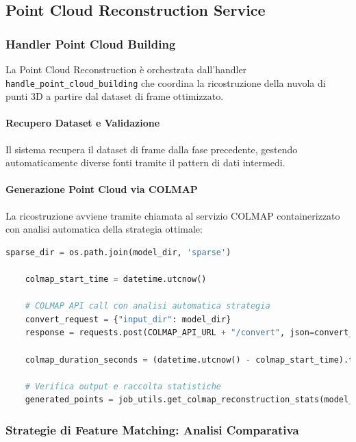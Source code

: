 \subsection{Point Cloud Reconstruction Service}

\subsubsection{Handler Point Cloud Building}
La Point Cloud Reconstruction è orchestrata dall'handler \texttt{handle\_point\_cloud\_building} che coordina la ricostruzione della nuvola di punti 3D a partire dal dataset di frame ottimizzato.

\paragraph{Recupero Dataset e Validazione}
Il sistema recupera il dataset di frame dalla fase precedente, gestendo automaticamente diverse fonti tramite il pattern di dati intermedi.

\paragraph{Generazione Point Cloud via COLMAP}
La ricostruzione avviene tramite chiamata al servizio COLMAP containerizzato con analisi automatica della strategia ottimale:

\begin{lstlisting}[language=python, caption=Generazione point cloud con monitoraggio performance]
	sparse_dir = os.path.join(model_dir, 'sparse')
	
	colmap_start_time = datetime.utcnow()
	
	# COLMAP API call con analisi automatica strategia
	convert_request = {"input_dir": model_dir}
	response = requests.post(COLMAP_API_URL + "/convert", json=convert_request)
	
	colmap_duration_seconds = (datetime.utcnow() - colmap_start_time).total_seconds()
	
	# Verifica output e raccolta statistiche
	generated_points = job_utils.get_colmap_reconstruction_stats(model_dir)
\end{lstlisting}

\subsubsection{Strategie di Feature Matching: Analisi Comparativa}

